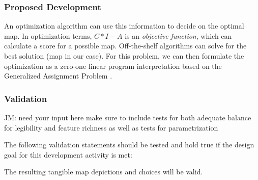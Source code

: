 

\subsubsection{Proposed Development}

An optimization algorithm can use this information to decide on the optimal map. In optimization terms, $C*I-A$ is an \textit{objective function}, which can calculate a score for a possible map. Off-the-shelf algorithms can solve for the best solution (map in our case). For this problem, we can then  formulate the optimization as a zero-one linear program interpretation based on the Generalized Assignment Problem
\cite{kuhn1955hungarian}. 

\subsubsection{Validation}
\ac{JM: need your input here}
\ac{ make sure to include tests for both adequate balance for legibility and feature richness as well as tests for parametrization }

The following validation statements should be tested and hold true if the design goal for this development activity is met: 

The resulting tangible map depictions and choices will be valid.

